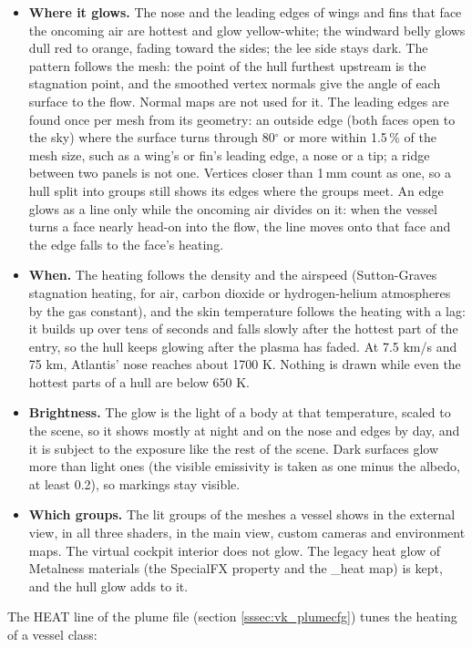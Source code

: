 \documentclass[Orbiter Developer Manual.tex]{subfiles}
\begin{document}
\begin{sloppypar}
\begin{itemize}
\item \textbf{Where it glows.} The nose and the leading edges of wings and fins that face the oncoming air are hottest and glow yellow-white; the windward belly glows dull red to orange, fading toward the sides; the lee side stays dark. The pattern follows the mesh: the point of the hull furthest upstream is the stagnation point, and the smoothed vertex normals give the angle of each surface to the flow. Normal maps are not used for it. The leading edges are found once per mesh from its geometry: an outside edge (both faces open to the sky) where the surface turns through 80$^{\circ}$ or more within 1.5\,\% of the mesh size, such as a wing's or fin's leading edge, a nose or a tip; a ridge between two panels is not one. Vertices closer than 1\,mm count as one, so a hull split into groups still shows its edges where the groups meet. An edge glows as a line only while the oncoming air divides on it: when the vessel turns a face nearly head-on into the flow, the line moves onto that face and the edge falls to the face's heating.
\item \textbf{When.} The heating follows the density and the airspeed (Sutton-Graves stagnation heating, for air, carbon dioxide or hydrogen-helium atmospheres by the gas constant), and the skin temperature follows the heating with a lag: it builds up over tens of seconds and falls slowly after the hottest part of the entry, so the hull keeps glowing after the plasma has faded. At 7.5 km/s and 75 km, Atlantis' nose reaches about 1700 K. Nothing is drawn while even the hottest parts of a hull are below 650 K.
\item \textbf{Brightness.} The glow is the light of a body at that temperature, scaled to the scene, so it shows mostly at night and on the nose and edges by day, and it is subject to the exposure like the rest of the scene. Dark surfaces glow more than light ones (the visible emissivity is taken as one minus the albedo, at least 0.2), so markings stay visible.
\item \textbf{Which groups.} The lit groups of the meshes a vessel shows in the external view, in all three shaders, in the main view, custom cameras and environment maps. The virtual cockpit interior does not glow. The legacy heat glow of Metalness materials (the SpecialFX property and the \_heat map) is kept, and the hull glow adds to it.
\end{itemize}

\noindent
The HEAT line of the plume file (section \ref{sssec:vk_plumecfg}) tunes the heating of a vessel class:


\end{sloppypar}
\end{document}
